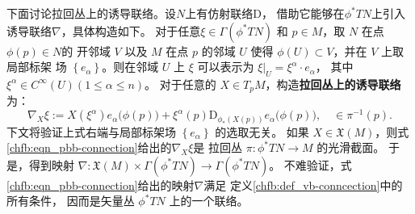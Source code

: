 下面讨论{拉回丛上的诱导联络}。设$N$上有仿射联络$\mathrm{D}$，
借助它能够在$\phi^* T N$上引入诱导联络$\nabla$，具体构造如下。
对于任意$\xi \in \Gamma(\phi^* T N)$ 和 $p \in M$，取 $N$ 在点 $\phi(p) \in N$的
开邻域 $V$ 以及 $M$ 在点 $p$ 的邻域 $U$ 使得 $\phi(U) \subset V$，并在 $V$ 上取局部标架
场 $\left\{e_\alpha\right\}$。则在邻域 $U$ 上 $\xi$ 可以表示为
$\xi |_U=\xi^\alpha \cdot e_\alpha$，
其中$\xi^\alpha \in C^{\infty}(U)(1 \leqslant \alpha \leqslant n)$。
对于任意的 $X \in T_p M$，构造\textbf{拉回丛上的诱导联络}为：
\begin{equation}\label{chfb:eqn_pbb-connection}
    \nabla_X \xi := X(\xi^\alpha ) e_\alpha\bigl(\phi(p)\bigr)+\xi^\alpha(p)
    \mathrm{D}_{\phi_*(X(p))} e_\alpha\bigl(\phi(p)\bigr), \quad \in \pi^{-1}(p) .
\end{equation}
下文将验证上式右端与局部标架场 $\left\{e_\alpha\right\}$ 的选取无关。
如果 $X \in \mathfrak{X}(M)$，则式\eqref{chfb:eqn_pbb-connection}给出的$\nabla_X \xi$是
拉回丛 $\pi: \phi^* T N \rightarrow M$ 的光滑截面。
于是，得到映射 $\nabla: \mathfrak{X}(M) \times \Gamma\left(\phi^* T N\right)
\rightarrow \Gamma\left(\phi^* T N\right)$。
不难验证，式\eqref{chfb:eqn_pbb-connection}给出的映射$\nabla$满足
定义\ref{chfb:def_vb-conncection}中的所有条件，
因而是矢量丛 $\phi^* T N$ 上的一个联络。

